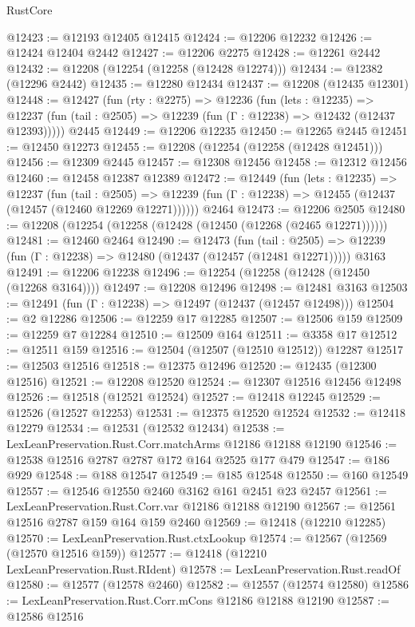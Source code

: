 \begin{lexlean}{RustCore}
\begin{coremodule}
@12423 := @12193 @12405 @12415
@12424 := @12206 @12232
@12426 := @12424 @12404 @2442
@12427 := @12206 @2275
@12428 := @12261 @2442
@12432 := @12208 (@12254 (@12258 (@12428 @12274)))
@12434 := @12382 (@12296 @2442)
@12435 := @12280 @12434
@12437 := @12208 (@12435 @12301)
@12448 := @12427
    (fun (rty : @2275) =>
    @12236
      (fun (lets : @12235) =>
      @12237 (fun (tail : @2505) => @12239 (fun (Γ : @12238) => @12432 (@12437 @12393)))))
    @2445
@12449 := @12206 @12235
@12450 := @12265 @2445
@12451 := @12450 @12273
@12455 := @12208 (@12254 (@12258 (@12428 @12451)))
@12456 := @12309 @2445
@12457 := @12308 @12456
@12458 := @12312 @12456
@12460 := @12458 @12387 @12389
@12472 := @12449
    (fun (lets : @12235) =>
    @12237
      (fun (tail : @2505) =>
      @12239 (fun (Γ : @12238) => @12455 (@12437 (@12457 (@12460 @12269 @12271))))))
    @2464
@12473 := @12206 @2505
@12480 := @12208 (@12254 (@12258 (@12428 (@12450 (@12268 (@2465 @12271))))))
@12481 := @12460 @2464
@12490 := @12473
    (fun (tail : @2505) => @12239 (fun (Γ : @12238) => @12480 (@12437 (@12457 (@12481 @12271)))))
    @3163
@12491 := @12206 @12238
@12496 := @12254 (@12258 (@12428 (@12450 (@12268 @3164))))
@12497 := @12208 @12496
@12498 := @12481 @3163
@12503 := @12491 (fun (Γ : @12238) => @12497 (@12437 (@12457 @12498)))
@12504 := @2 @12286
@12506 := @12259 @17 @12285
@12507 := @12506 @159
@12509 := @12259 @7 @12284
@12510 := @12509 @164
@12511 := @3358 @17
@12512 := @12511 @159
@12516 := @12504 (@12507 (@12510 @12512)) @12287
@12517 := @12503 @12516
@12518 := @12375 @12496
@12520 := @12435 (@12300 @12516)
@12521 := @12208 @12520
@12524 := @12307 @12516 @12456 @12498
@12526 := @12518 (@12521 @12524)
@12527 := @12418 @12245
@12529 := @12526 (@12527 @12253)
@12531 := @12375 @12520 @12524
@12532 := @12418 @12279
@12534 := @12531 (@12532 @12434)
@12538 := LexLeanPreservation.Rust.Corr.matchArms @12186 @12188 @12190
@12546 := @12538 @12516 @2787 @2787 @172 @164 @2525 @177 @479
@12547 := @186 @929
@12548 := @188 @12547
@12549 := @185 @12548
@12550 := @160 @12549
@12557 := @12546 @12550 @2460 @3162 @161 @2451 @23 @2457
@12561 := LexLeanPreservation.Rust.Corr.var @12186 @12188 @12190
@12567 := @12561 @12516 @2787 @159 @164 @159 @2460
@12569 := @12418 (@12210 @12285)
@12570 := LexLeanPreservation.Rust.ctxLookup
@12574 := @12567 (@12569 (@12570 @12516 @159))
@12577 := @12418 (@12210 LexLeanPreservation.Rust.RIdent)
@12578 := LexLeanPreservation.Rust.readOf
@12580 := @12577 (@12578 @2460)
@12582 := @12557 (@12574 @12580)
@12586 := LexLeanPreservation.Rust.Corr.mCons @12186 @12188 @12190
@12587 := @12586 @12516

\end{coremodule}
\end{lexlean}
